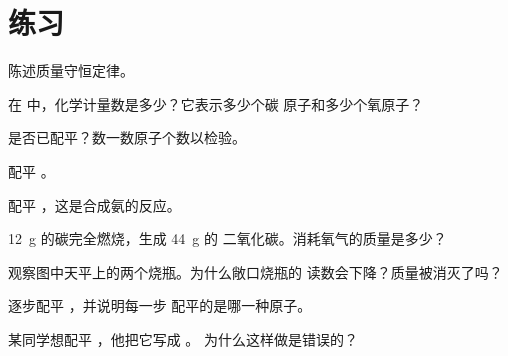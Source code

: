 \section{练习}

\begin{exercise}[$\star$]\label{exo:g8:balanced-equations:1}
陈述质量守恒定律。
\end{exercise}

\begin{exercise}[$\star$]\label{exo:g8:balanced-equations:2}
在  中，化学计量数是多少？它表示多少个碳
原子和多少个氧原子？
\end{exercise}

\begin{exercise}[$\star$]\label{exo:g8:balanced-equations:3}
 是否已配平？数一数原子个数以检验。
\end{exercise}

\begin{exercise}[$\star$]\label{exo:g8:balanced-equations:4}
配平 。 %
\end{exercise}

\begin{exercise}[$\star\star$]\label{exo:g8:balanced-equations:5}
配平 ，这是合成氨的反应。 %
\end{exercise}

\begin{exercise}[$\star\star$]\label{exo:g8:balanced-equations:6}
\qty{12}{g} 的碳完全燃烧，生成 \qty{44}{g} 的
二氧化碳。消耗氧气的质量是多少？
\end{exercise}

\begin{exercise}[$\star\star$]\label{exo:g8:balanced-equations:7}
观察图中天平上的两个烧瓶。为什么敞口烧瓶的
读数会下降？质量被消灭了吗？
\end{exercise}

\begin{exercise}[$\star\star$]\label{exo:g8:balanced-equations:8}
逐步配平 ，并说明每一步 %
配平的是哪一种原子。
\end{exercise}

\begin{exercise}[$\star\star$]\label{exo:g8:balanced-equations:9}
某同学想配平 ，他把它写成 。 %
为什么这样做是错误的？
\end{exercise}

